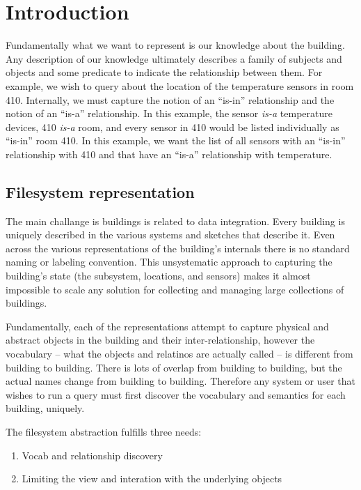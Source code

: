 \section{Introduction}

Fundamentally what we want to represent is our knowledge about the building.  Any description
of our knowledge ultimately describes a family of subjects and objects and some predicate to indicate
the relationship between them.  For example, we wish to query about the location
of the temperature sensors in room 410.  Internally, we must capture the notion of an ``is-in'' relationship
and the notion of an ``is-a'' relationship.  In this example, the sensor \emph{is-a} temperature devices,
410 \emph{is-a} room, and every sensor in 410 would be listed individually as ``is-in'' room 410.
In this example, we want the list of all sensors with an ``is-in'' relationship with 410 and 
that have an ``is-a'' relationship with temperature.

\subsection{Filesystem representation}
The main challange is buildings is related to data integration.  Every building is uniquely described in
the various systems and sketches that describe it.  Even across the various representations of the building's internals
there is no standard naming or labeling convention.  This unsystematic approach to capturing the building's state
(the subsystem, locations, and sensors) makes it almost impossible to scale any solution for
collecting and managing large collections of buildings.

Fundamentally, each of the representations attempt to capture physical and abstract objects in the building
and their inter-relationship, however the vocabulary -- what the objects and relatinos are actually called --
is different from building to building.  There is lots of overlap from building to building, but the actual
names change from building to building.  Therefore any system or user that wishes to run a query must first
discover the vocabulary and semantics for each building, uniquely.

The filesystem abstraction fulfills three needs:

\begin{enumerate}
\item Vocab and relationship discovery
\item Limiting the view and interation with the underlying objects
\end{enumerate}



